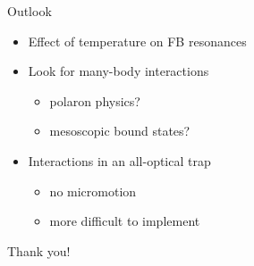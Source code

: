 \begin{frame}[t]{Outlook}
\begin{itemize}
  \item Effect of temperature on FB resonances
  \item Look for many-body interactions
  \begin{itemize}
    \item polaron physics?
    \item mesoscopic bound states?
  \end{itemize}
  \item Interactions in an all-optical trap
  \begin{itemize}
    \item no micromotion
    \item more difficult to implement
  \end{itemize}

\end{itemize}
\end{frame}

\begin{frame}[t]{Thank you!}

\end{frame}
